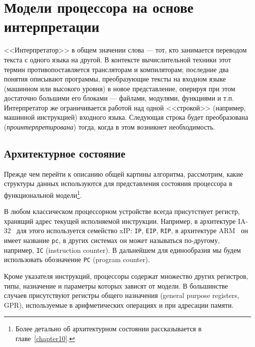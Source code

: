 \chapter{Модели процессора на основе интерпретации}\label{chapter03}


<<Интерпретатор>> в общем значении слова --- тот, кто занимается переводом текста с одного языка на другой. В контексте вычислительной техники этот термин противопоставляется трансляторам и компиляторам; последние два понятия описывают программы, преобразующие тексты на входном языке (машинном или высокого уровня) в новое представление, оперируя при этом достаточно большими его блоками --- файлами, модулями, функциями и т.п. Интерпретатор же ограничивается работой над одной <<строкой>> (например, машинной инструкцией) входного языка. Следующая строка будет преобразована (\emph{проинтерпретирована}) тогда, когда в этом возникнет необходимость.

\section{Архитектурное состояние}

Прежде чем перейти к описанию общей картины алгоритма, рассмотрим, какие структуры данных используются для представления состояния процессора в функциональной модели\footnote{Более детально об архитектурном состоянии рассказывается в главе~\ref{chapter10}.}.

В любом классическом процессорном устройстве всегда присутствует регистр, хранящий адрес текущей исполняемой инструкции. Например, в архитектуре IA-32~\cite{intelmanual2a} для этого используется семейство xIP: \texttt{IP}, \texttt{EIP}, \texttt{RIP}, в архитектуре ARM~\cite{arm-sdg} он имеет название \texttt{pc}, в других системах он может называться по-другому, например, \texttt{IC} (\abbr instruction counter). В дальнейшем для единообразия мы будем использовать обозначение \texttt{PC} (\abbr program counter).

Кроме указателя инструкций, процессоры содержат множество других регистров, типы, назначение и параметры которых зависят от модели. В большинстве случаев присутствуют регистры общего назначения (\abbr general purpose registers, GPR), используемые в арифметических операциях и при адресации памяти.


